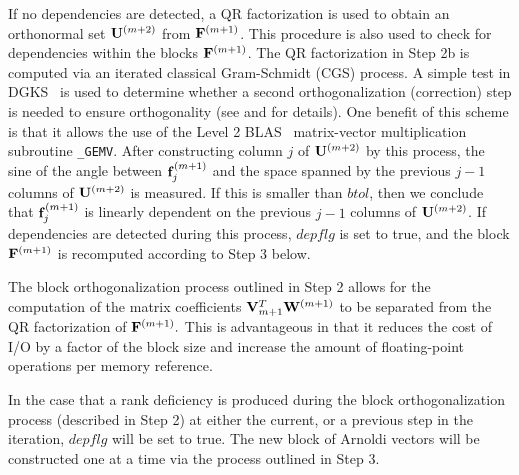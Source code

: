 \documentclass{article}
\newcommand{\bF}{{\bf F}}
\newcommand{\bU}{{\bf U}}
\newcommand{\bV}{{\bf V}}
\newcommand{\bW}{{\bf W}}
\begin{document}
If no dependencies are detected, a QR factorization is used to
obtain an orthonormal set $\bU^{(m+2)}$ from $\bF^{(m+1)}$. This
procedure is also used to check for dependencies within the blocks
$\bF^{(m+1)}$. The QR factorization in Step 2b is computed via an
iterated classical Gram-Schmidt (CGS) process. A simple test in
DGKS~\cite{dgks:76} is used to determine whether a second
orthogonalization (correction) step is needed to ensure
orthogonality (see \cite{Le95} and \cite{lesy:98} for details).
One benefit of this scheme is that it allows the use of the Level
2 {\small BLAS}~\cite{ddhh:88} matrix-vector multiplication
subroutine {\tt \_GEMV}. After constructing column $j$ of
$\bU^{(m+2)}$ by this process, the sine of the angle between ${\bf
f}_j^{(m+1)}$ and the space spanned by the previous $j-1$ columns
of $\bU^{(m+2)}$ is measured. If this is smaller than $btol$, then
we conclude that ${\bf f}_j^{(m+1)}$ is linearly dependent on the
previous $j-1$ columns of $\bU^{(m+2)}$. If dependencies are
detected during this process, $depflg$ is set to true, and the
block $\bF^{(m+1)}$ is recomputed according to Step 3 below.

The block orthogonalization process outlined in Step 2 allows for
the computation of the matrix coefficients $\bV_{m+1}^T
\bW^{(m+1)}$ to be separated from the QR factorization of
$\bF^{(m+1)}.$ This is advantageous in that it reduces the cost of
I/O by a factor of the block size and increase the amount of
floating-point operations per memory reference.

In the case that a rank deficiency is produced during the block
orthogonalization process (described in Step 2) at either the
current, or a previous step in the iteration, $depflg$ will be set
to true. The new block of Arnoldi vectors will be constructed one
at a time via the process outlined in Step 3.
\end{document}
